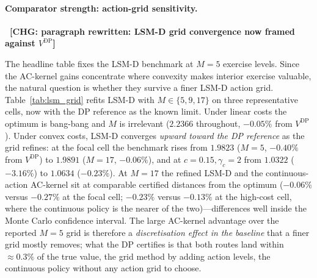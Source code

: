 \documentclass[a4paper,fleqn]{cas-dc}
\newcommand{\hlblock}[1]{\par\noindent
    \colorbox{chgyellow}{\parbox{\dimexpr\linewidth-2\fboxsep\relax}{#1}}\par}
\newcommand{\hlblock}[1]{#1}
\newcommand{\chg}[1]{{\normalfont\bfseries\color{red}~[CHG: \textsf{\footnotesize #1}]~}}
\newcommand{\chg}[1]{}
\begin{document}
\paragraph{Comparator strength: action-grid sensitivity.}
\chg{paragraph rewritten: LSM-D grid convergence now framed against $V^{\mathrm{DP}}$}%
\hlblock{The headline table fixes the LSM-D benchmark at $M=5$ exercise levels. Since the AC-kernel gains concentrate where convexity makes interior exercise valuable, the natural question is whether they survive a finer LSM-D action grid. Table~\ref{tab:lsm_grid} refits LSM-D with $M\in\{5,9,17\}$ on three representative cells, now with the DP reference as the known limit. Under linear costs the optimum is bang-bang and $M$ is irrelevant ($2.2366$ throughout, $-0.05\%$ from $V^{\mathrm{DP}}$). Under convex costs, LSM-D converges \emph{upward toward the DP reference} as the grid refines: at the focal cell the benchmark rises from $1.9823$ ($M=5$, $-0.40\%$ from $V^{\mathrm{DP}}$) to $1.9891$ ($M=17$, $-0.06\%$), and at $c=0.15,\gamma_c=2$ from $1.0322$ ($-3.16\%$) to $1.0634$ ($-0.23\%$). At $M=17$ the refined LSM-D and the continuous-action AC-kernel sit at comparable certified distances from the optimum ($-0.06\%$ versus $-0.27\%$ at the focal cell; $-0.23\%$ versus $-0.13\%$ at the high-cost cell, where the continuous policy is the nearer of the two)---differences well inside the Monte Carlo confidence interval. The large AC-kernel advantage over the reported $M=5$ grid is therefore a \emph{discretisation effect in the baseline} that a finer grid mostly removes; what the DP certifies is that both routes land within $\approx 0.3\%$ of the true value, the grid method by adding action levels, the continuous policy without any action grid to choose.}
\end{document}
